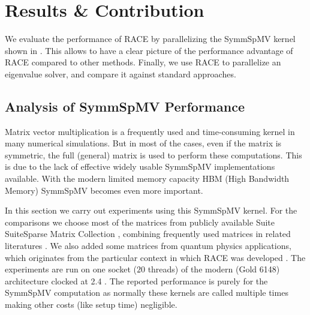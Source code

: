  
\section{Results \& Contribution} \label{sec:results}
We evaluate the performance of \acrshort{RACE} by parallelizing the \acrshort{SymmSpMV}
kernel shown in . This allows to have a clear picture of the
performance advantage of \acrshort{RACE} compared to other methods. Finally,
 we use \acrshort{RACE} to parallelize an eigenvalue solver, 
and compare it against standard approaches.

\subsection{Analysis of SymmSpMV Performance} \label{subsec:perf_symm_spmv}
Matrix vector multiplication is a frequently used and time-consuming kernel in
many numerical simulations. But in most of the cases, even if the matrix is symmetric,
the full (general) matrix is used to perform these computations.
This is due to the lack of effective widely usable \acrshort{SymmSpMV} implementations available.
With the modern limited memory capacity HBM (High Bandwidth Memory) \acrshort{SymmSpMV}
becomes even more important.

In this section we carry out experiments using this \acrshort{SymmSpMV} kernel.
For the comparisons we choose most of the matrices from publicly available Suite
SuiteSparse Matrix Collection \cite{UOF}, combining frequently 
used matrices in related literatures \cite{RSB,park_ls}. We also added
some matrices from quantum physics applications, which originates from 
the particular context in which \acrshort{RACE} was developed \cite{ESSEX}.
The experiments are
run on one socket ($20$ threads) of the modern \Intel \SKX (Gold 6148) architecture
clocked at 2.4 \GHZ. The reported performance is purely for the \acrshort{SymmSpMV}
computation as normally these kernels are called multiple times making other
costs (like setup time) negligible.

